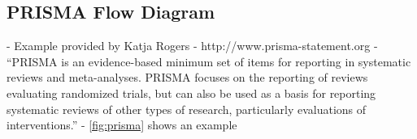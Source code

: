 







\subsection{PRISMA Flow Diagram}

- Example provided by Katja Rogers
- http://www.prisma-statement.org
- ``PRISMA is an evidence-based minimum set of items for reporting in systematic reviews and meta-analyses. PRISMA focuses on the reporting of reviews evaluating randomized trials, but can also be used as a basis for reporting systematic reviews of other types of research, particularly evaluations of interventions.''
- \autoref{fig:prisma} shows an example


